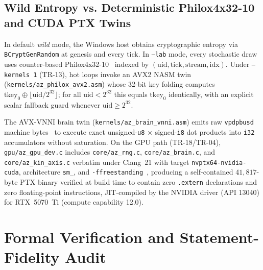 \documentclass[11pt,reqno]{amsart}
\newcommand{\code}[1]{\texttt{\footnotesize #1}}
\newcommand{\us}{\_\allowbreak}
\newcommand{\slsh}{/\allowbreak}
\begin{document}
\subsection{Wild Entropy vs. Deterministic Philox4x32-10 and CUDA PTX Twins}

In default \emph{wild} mode, the Windows host obtains cryptographic entropy via \code{BCryptGenRandom} at genesis and every tick. In \code{--lab} mode, every stochastic draw uses counter-based Philox4x32-10~\cite{salmon2011parallel} indexed by $(\text{uid}, \text{tick}, \text{stream}, \text{idx})$. Under \code{--kernels 1} (TR-13), hot loops invoke an AVX2 NASM twin (\code{kernels\slsh az\us philox\us avx2.asm}) whose 32-bit key folding computes $\text{tkey}_0 \oplus \lfloor \text{uid} / 2^{32} \rfloor$; for all $\text{uid} < 2^{32}$ this equals $\text{tkey}_0$ identically, with an explicit scalar fallback guard whenever $\text{uid} \ge 2^{32}$.

The AVX-VNNI brain twin (\code{kernels\slsh az\us brain\us vnni.asm}) emits raw \code{vpdpbusd} machine bytes~\cite{intel2024sdm} to execute exact unsigned-\code{u8} $\times$ signed-\code{i8} dot products into \code{i32} accumulators without saturation. On the GPU path (TR-18/TR-04), \code{gpu\slsh az\us gpu\us dev.c} includes \code{core\slsh az\us rng.c}, \code{core\slsh az\us brain.c}, and \code{core\slsh az\us kin\us axis.c} verbatim under Clang~21 with target \code{nvptx64-nvidia-cuda}, architecture \code{sm\us 80}, and \code{-ffreestanding}~\cite{nvidia2024ptx}, producing a self-contained $41{,}817$-byte PTX binary verified at build time to contain zero \code{.extern} declarations and zero floating-point instructions, JIT-compiled by the NVIDIA driver (API 13040) for RTX~5070~Ti (compute capability 12.0).

\section{Formal Verification and Statement-Fidelity Audit}
\end{document}
